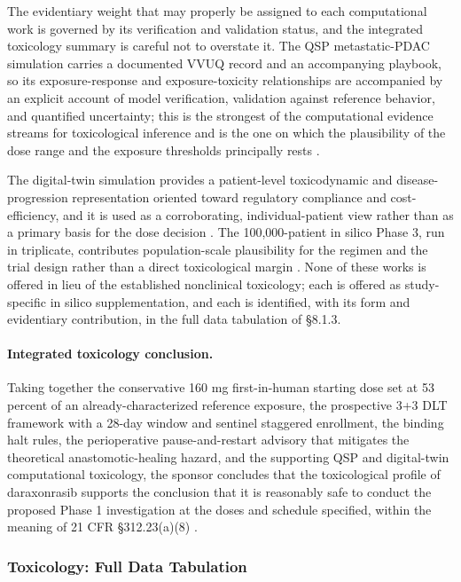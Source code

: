 The evidentiary weight that may properly be assigned to each computational work is
governed by its verification and validation status, and the integrated toxicology
summary is careful not to overstate it. The QSP metastatic-PDAC simulation carries
a documented VVUQ record and an accompanying playbook, so its exposure-response and
exposure-toxicity relationships are accompanied by an explicit account of model
verification, validation against reference behavior, and quantified uncertainty;
this is the strongest of the computational evidence streams for toxicological
inference and is the one on which the plausibility of the dose range and the
exposure thresholds principally rests \cite{qspmetpancre}. 

The digital-twin
simulation provides a patient-level toxicodynamic and disease-progression
representation oriented toward regulatory compliance and cost-efficiency, and it is
used as a corroborating, individual-patient view rather than as a primary basis for
the dose decision \cite{fdadigtwinpc}. The 100,000-patient in silico Phase 3,
run in triplicate, contributes population-scale plausibility for the regimen and
the trial design rather than a direct toxicological margin
\cite{chatgpt100kp,pdacdigtwinp}. None of these works is offered in lieu of the
established nonclinical toxicology; each is offered as study-specific in silico
supplementation, and each is identified, with its form and evidentiary
contribution, in the full data tabulation of \S 8.1.3.

\paragraph{Integrated toxicology conclusion.}
Taking together the conservative 160 mg first-in-human starting dose set at 53
percent of an already-characterized reference exposure, the prospective 3+3 DLT
framework with a 28-day window and sentinel staggered enrollment, the binding
halt rules, the perioperative pause-and-restart advisory that mitigates the
theoretical anastomotic-healing hazard, and the supporting QSP and digital-twin
computational toxicology, the sponsor concludes that the toxicological profile of
daraxonrasib supports the conclusion that it is reasonably safe to conduct the
proposed Phase 1 investigation at the doses and schedule specified, within the
meaning of 21 CFR \S 312.23(a)(8) \cite{phase1guidance,cfr312paiuni}.

\subsubsection{Toxicology: Full Data Tabulation}

